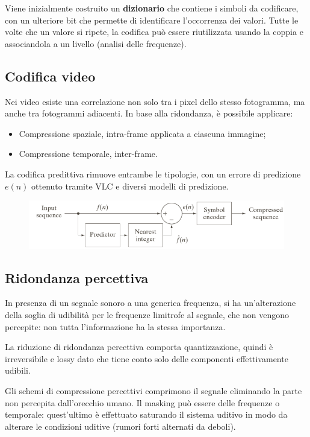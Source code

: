 Viene inizialmente costruito un \textbf{dizionario} che contiene i simboli da codificare, con un ulteriore bit che permette di identificare l'occorrenza dei valori. Tutte le volte che un valore si ripete, la codifica può essere riutilizzata usando la coppia e associandola a un livello (analisi delle frequenze). 

\subsection{Codifica video}
Nei video esiste una correlazione non solo tra i pixel dello stesso fotogramma, ma anche tra fotogrammi adiacenti. In base alla ridondanza, è possibile applicare:
\begin{itemize}
	\item Compressione spaziale, intra-frame applicata a ciascuna immagine;
	\item Compressione temporale, inter-frame.
\end{itemize}

La codifica predittiva rimuove entrambe le tipologie, con un errore di predizione $e(n)$ ottenuto tramite VLC e diversi modelli di predizione.

\begin{figure}[h]
	\centering
	\includegraphics[scale=0.5]{Lezioni/Immagini/codificapredittiva}
\end{figure}

\subsection{Ridondanza percettiva}
In presenza di un segnale sonoro a una generica frequenza, si ha un'alterazione della soglia di udibilità per le frequenze limitrofe al segnale, che non vengono percepite: non tutta l'informazione ha la stessa importanza. 

La riduzione di ridondanza percettiva comporta quantizzazione, quindi è irreversibile e lossy dato che tiene conto solo delle componenti effettivamente udibili.

Gli schemi di compressione percettivi comprimono il segnale eliminando la parte non percepita dall'orecchio umano. Il masking può essere delle frequenze o temporale: quest'ultimo è effettuato saturando il sistema uditivo in modo da alterare le condizioni uditive (rumori forti alternati da deboli).

